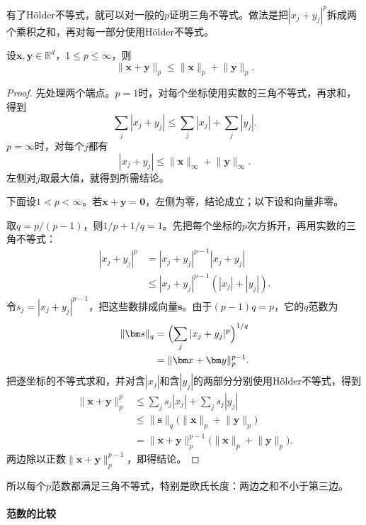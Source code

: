有了Hölder不等式，就可以对一般的$p$证明三角不等式。做法是把$|x_j+y_j|^p$拆成两个乘积之和，再对每一部分使用Hölder不等式。
\begin{theorem}[有限维Minkowski不等式]
\label{thm:linear-algebra-minkowski}
设$\bm x,\bm y\in\mathbb R^d$，$1\leq p\leq\infty$，则
\begin{equation}
 \lVert\bm x+\bm y\rVert_p\leq\lVert\bm x\rVert_p+\lVert\bm y\rVert_p.
 \label{eq:linear-algebra-minkowski}
\end{equation}
\end{theorem}
\begin{proof}
先处理两个端点。$p=1$时，对每个坐标使用实数的三角不等式，再求和，得到
\[
 \sum_j|x_j+y_j|\leq\sum_j|x_j|+\sum_j|y_j|.
\]
$p=\infty$时，对每个$j$都有
\[
 |x_j+y_j|\leq\lVert\bm x\rVert_\infty+\lVert\bm y\rVert_\infty.
\]
左侧对$j$取最大值，就得到所需结论。

下面设$1<p<\infty$。若$\bm x+\bm y=\bm0$，左侧为零，结论成立；以下设和向量非零。

取$q=p/(p-1)$，则$1/p+1/q=1$。先把每个坐标的$p$次方拆开，再用实数的三角不等式：
\[
 \begin{aligned}
 |x_j+y_j|^p
 &=|x_j+y_j|^{p-1}|x_j+y_j|\\
 &\leq |x_j+y_j|^{p-1}(|x_j|+|y_j|).
 \end{aligned}
\]
令$s_j=|x_j+y_j|^{p-1}$，把这些数排成向量$\bm s$。由于$(p-1)q=p$，它的$q$范数为
\[
 \begin{aligned}
 \lVert\bm s\rVert_q
 &=\Bigl(\sum_j|x_j+y_j|^p\Bigr)^{1/q}\\
 &=\lVert\bm x+\bm y\rVert_p^{p-1}.
 \end{aligned}
\]
把逐坐标的不等式求和，并对含$|x_j|$和含$|y_j|$的两部分分别使用Hölder不等式，得到
\[
 \begin{aligned}
 \lVert\bm x+\bm y\rVert_p^p
 &\leq\sum_js_j|x_j|+\sum_js_j|y_j|\\
 &\leq\lVert\bm s\rVert_q
       \bigl(\lVert\bm x\rVert_p+\lVert\bm y\rVert_p\bigr)\\
 &=\lVert\bm x+\bm y\rVert_p^{p-1}
       \bigl(\lVert\bm x\rVert_p+\lVert\bm y\rVert_p\bigr).
 \end{aligned}
\]
两边除以正数$\lVert\bm x+\bm y\rVert_p^{p-1}$，即得结论。
\end{proof}
所以每个$p$范数都满足三角不等式，特别是欧氏长度：两边之和不小于第三边。


\paragraph{范数的比较}
\label{sec:ls-error-scale-comparison}

